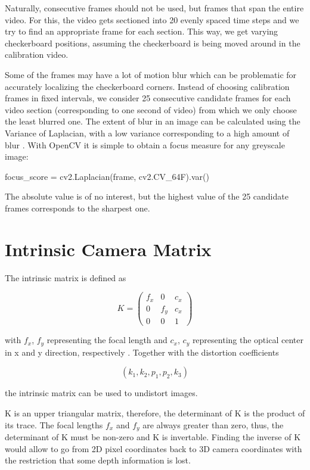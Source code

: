 \documentclass[bibliography=totoc]{scrartcl}
\begin{document}
Naturally, consecutive frames should not be used, but frames that span the entire video.
For this, the video gets sectioned into 20 evenly spaced time steps and we try to find an appropriate frame for each section.
This way, we get varying checkerboard positions, assuming the checkerboard is being moved around in the calibration video.

Some of the frames may have a lot of motion blur which can be problematic for accurately localizing the checkerboard corners.
Instead of choosing calibration frames in fixed intervals, we consider 25 consecutive candidate frames for each video section (corresponding to one second of video) from which we only choose the least blurred one.
The extent of blur in an image can be calculated using the Variance of Laplacian, with a low variance corresponding to a high amount of blur \cite{BlurDetection}.
With OpenCV it is simple to obtain a focus measure for any greyscale image:\\

\begin{python}
    focus_score = cv2.Laplacian(frame, cv2.CV_64F).var()
\end{python}

The absolute value is of no interest, but the highest value of the 25 candidate frames corresponds to the sharpest one.


\section{Intrinsic Camera Matrix}
The intrinsic matrix is defined as

$$
K =
\begin{pmatrix}
    f_x & 0 & c_x \\
    0 & f_y & c_x \\
    0 & 0 & 1
\end{pmatrix}
$$

with $f_x$, $f_y$ representing the focal length and $c_x$, $c_y$ representing the optical center in x and y direction, respectively \cite{CameraCalibration}.
Together with the distortion coefficients 

$$(k_1, k_2, p_1, p_2, k_3)$$

the intrinsic matrix can be used to undistort images.

K is an upper triangular matrix, therefore, the determinant of K is the product of its trace. 
The focal lengths $f_x$ and $f_y$ are always greater than zero, thus, the determinant of K must be non-zero and K is invertable.
Finding the inverse of K would allow to go from 2D pixel coordinates back to 3D camera coordinates with the restriction that some depth information is lost.
\end{document}

